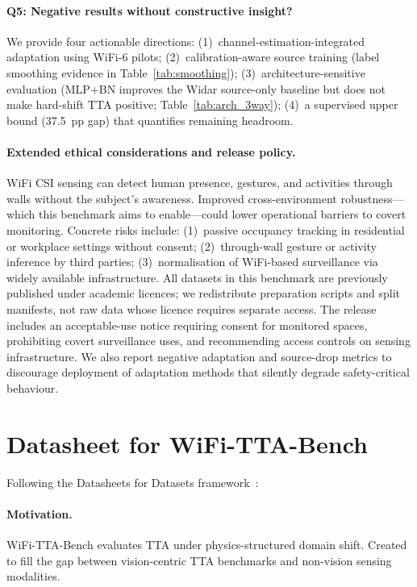 \paragraph{Q5: Negative results without constructive insight?}
We provide four actionable directions: (1)~channel-estimation-integrated adaptation using WiFi-6 pilots; (2)~calibration-aware source training (label smoothing evidence in Table~\ref{tab:smoothing}); (3)~architecture-sensitive evaluation (MLP+BN improves the Widar source-only baseline but does not make hard-shift TTA positive; Table~\ref{tab:arch_3way}); (4)~a supervised upper bound (37.5~pp gap) that quantifies remaining headroom.

\paragraph{Extended ethical considerations and release policy.}
WiFi CSI sensing can detect human presence, gestures, and activities through walls without the subject's awareness. Improved cross-environment robustness---which this benchmark aims to enable---could lower operational barriers to covert monitoring. Concrete risks include: (1)~passive occupancy tracking in residential or workplace settings without consent; (2)~through-wall gesture or activity inference by third parties; (3)~normalisation of WiFi-based surveillance via widely available infrastructure. All datasets in this benchmark are previously published under academic licences; we redistribute preparation scripts and split manifests, not raw data whose licence requires separate access. The release includes an acceptable-use notice requiring consent for monitored spaces, prohibiting covert surveillance uses, and recommending access controls on sensing infrastructure. We also report negative adaptation and source-drop metrics to discourage deployment of adaptation methods that silently degrade safety-critical behaviour.

\section{Datasheet for WiFi-TTA-Bench}
\label{app:datasheet}

Following the Datasheets for Datasets framework~\cite{gebru2021datasheets}:

\paragraph{Motivation.} WiFi-TTA-Bench evaluates TTA under physics-structured domain shift. Created to fill the gap between vision-centric TTA benchmarks and non-vision sensing modalities.

